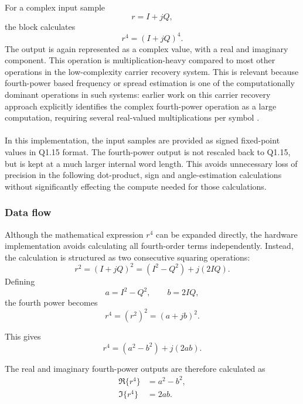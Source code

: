For a complex input sample
\begin{equation}
    r = I + jQ ,
\end{equation}
the block calculates
\begin{equation}
    r^4 = (I+jQ)^4 .
\end{equation}
The output is again represented as a complex value, with a real and imaginary component. 
This operation is multiplication-heavy compared to most other operations in the low-complexity 
carrier recovery system. This is relevant because fourth-power based frequency or spread 
estimation is one of the computationally dominant operations in such systems: earlier work on 
this carrier recovery approach explicitly identifies the complex fourth-power operation as a 
large computation, requiring several real-valued multiplications per symbol 
\cite{Jonas}.
\\\\
In this implementation, the input samples are provided as signed fixed-point values in Q1.15 
format. The fourth-power output is not rescaled back to Q1.15, but is kept at a much larger 
internal word length. This avoids unnecessary loss of precision in the following dot-product, 
sign and angle-estimation calculations without significantly effecting the compute needed for those 
calculations.

\subsubsection{Data flow}

Although the mathematical expression $r^4$ can be expanded directly, the hardware 
implementation avoids calculating all fourth-order terms independently. Instead, the 
calculation is structured as two consecutive squaring operations:
$$
    r^2 = (I+jQ)^2 = (I^2-Q^2) + j(2IQ).
$$
Defining
$$
    a = I^2 - Q^2,
    \qquad
    b = 2IQ,
$$
the fourth power becomes
$$
    r^4 = (r^2)^2 = (a+jb)^2 .
$$

This gives
\begin{equation}
    r^4 = (a^2-b^2) + j(2ab).
\end{equation}

The real and imaginary fourth-power outputs are therefore calculated as
\begin{align}\label{eq:re_and_im_fourth_power}
    \Re\{r^4\} &= a^2 - b^2, \\
    \Im\{r^4\} &= 2ab.
\end{align}

